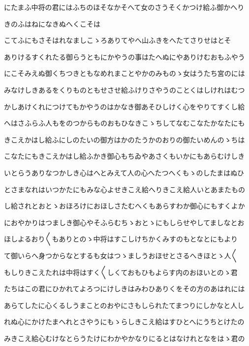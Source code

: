 \documentclass[a4paper,11pt,landscape]{ltjtarticle}
\begin{document}
\par\medskip
にたまふ中将の君にはふちのほそなかそへて女のさうそくかつけ給ふ御かへり
\par\medskip
きのふはねになきぬへくこそは
\par\medskip
こてふにもさそはれなましこゝろありてやへ山ふきをへたてさりせはとそ
\par\medskip
ありけるすくれたる御らうともにかやうの事はたへぬにやありけむおもふやう
\par\medskip
にこそみえぬ御くちつきともなめれまことやかのみものゝ女はうたち宮のには
\par\medskip
みなけしきあるをくりものともせさせ給ふけりさやうのことくはしけれはむつ
\par\medskip
かしあけくれにつけてもかやうのはかなき御あそひしけく心をやりてすくし給
\par\medskip
へはさふらふ人もをのつからものおもひなきこゝちしてなむこなたかなたにも
\par\medskip
きこえかはし給ふにしのたいの御方はかのたうかのおりの御たいめんのゝちは
\par\medskip
こなたにもきこえかはし給ふかき御心もちゐやあさくもいかにもあらむけしき
\par\medskip
いとらうありなつかしき心はへとみえて人の心へたつへくもゝのしたまはぬひ
\par\medskip
とさまなれはいつかたにもみな心よせきこえ給へりきこえ給人いとあまたもの
\par\medskip
し給されとおとゝおほろけにおほしさたむへくもあらすわか御心にもすくよか
\par\medskip
におやかりはつましき御心やそふらむちゝおとゝにもしらせやしてましなとお
\par\medskip
ほしよるおり〱もありとのゝ中将はすこしけちかくみすのもとなとにもより
\par\medskip
て御いらへ身つからなとするも女はつゝましうおほせとさるへきほとゝ人〱
\par\medskip
もしりきこえたれは中将はすく〱しくておもひもよらす内のおほいとのゝ君
\par\medskip
たちはこの君にひかれてよろつにけしきはみわひありくをその方のあはれには
\par\medskip
あらてしたに心くるしうまことのおやにさもしられたてまつりにしかなと人し
\par\medskip
れぬ心にかけたまへれとさやうにもゝらしきこえ給はすひとへにうちとけたの
\par\medskip
みきこえ給心むけなとらうたけにわかやかなりにるとはなけれとなをはゝ君の
\par\medskip
\end{document}
